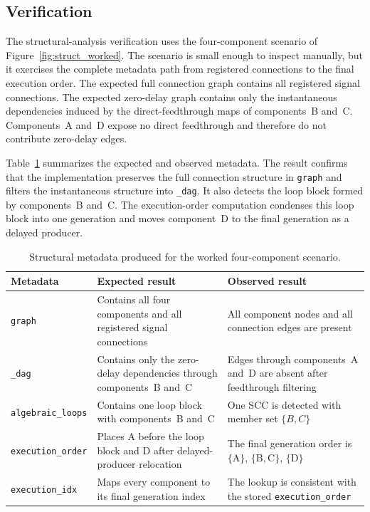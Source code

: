 \subsection{Verification}
\label{sec:impl_structural_verification}

The structural-analysis verification uses the four-component scenario of Figure~\ref{fig:struct_worked}.
The scenario is small enough to inspect manually, but it exercises the complete metadata path from registered connections to the final execution order.
The expected full connection graph contains all registered signal connections.
The expected zero-delay graph contains only the instantaneous dependencies induced by the direct-feedthrough maps of components~B and~C.
Components~A and~D expose no direct feedthrough and therefore do not contribute zero-delay edges.

Table~\ref{tab:structural_verification} summarizes the expected and observed metadata.
The result confirms that the implementation preserves the full connection structure in \texttt{graph} and filters the instantaneous structure into \texttt{\_dag}.
It also detects the loop block formed by components~B and~C.
The execution-order computation condenses this loop block into one generation and moves component~D to the final generation as a delayed producer.

\begin{table}[tbp]
  \centering
  \small
  \caption{Structural metadata produced for the worked four-component scenario.}
  \label{tab:structural_verification}
  \begin{tabular}{p{3.4cm} p{5.4cm} p{5.6cm}}
    \toprule
    \textbf{Metadata} & \textbf{Expected result} & \textbf{Observed result} \\
    \midrule
    \texttt{graph}
      & Contains all four components and all registered signal connections
      & All component nodes and all connection edges are present \\
    \addlinespace
    \texttt{\_dag}
      & Contains only the zero-delay dependencies through components~B and~C
      & Edges through components~A and~D are absent after feedthrough filtering \\
    \addlinespace
    \texttt{algebraic\_loops}
      & Contains one loop block with components~B and~C
      & One \ac{SCC} is detected with member set \(\{B,C\}\) \\
    \addlinespace
    \texttt{execution\_order}
      & Places A before the loop block and D after delayed-producer relocation
      & The final generation order is \(\{\mathrm{A}\}\), \(\{\mathrm{B},\mathrm{C}\}\), \(\{\mathrm{D}\}\) \\
        \addlinespace
    \texttt{execution\_idx}
      & Maps every component to its final generation index
      & The lookup is consistent with the stored \texttt{execution\_order} \\
    \bottomrule
  \end{tabular}
\end{table}
